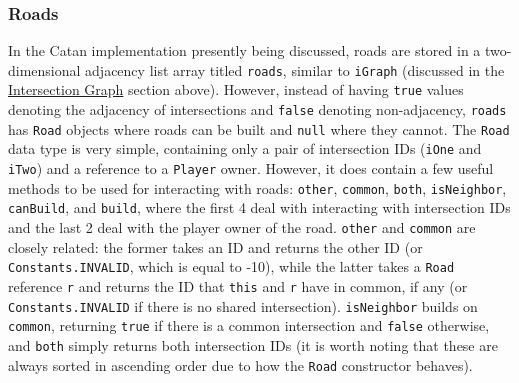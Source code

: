 \documentclass[pageno]{jpaper}
\begin{document}
\begin{doublespacing}
\subsubsection{Roads}

In the Catan implementation presently being discussed, roads are stored in a two-dimensional adjacency list array titled \lstinline$roads$, similar to \lstinline$iGraph$ (discussed in the \hyperlink{sec:intersection_graph}{Intersection Graph} section above). However, instead of having \lstinline$true$ values denoting the adjacency of intersections and \lstinline$false$ denoting non-adjacency, \lstinline$roads$ has \lstinline$Road$ objects where roads can be built and \lstinline$null$ where they cannot. The \lstinline$Road$ data type is very simple, containing only a pair of intersection IDs (\lstinline$iOne$ and \lstinline$iTwo$) and a reference to a \lstinline$Player$ owner. However, it does contain a few useful methods to be used for interacting with roads: \lstinline$other$, \lstinline$common$, \lstinline$both$, \lstinline$isNeighbor$, \lstinline$canBuild$, and \lstinline$build$, where the first 4 deal with interacting with intersection IDs and the last 2 deal with the player owner of the road. \lstinline$other$ and \lstinline$common$ are closely related: the former takes an ID and returns the other ID (or \lstinline$Constants.INVALID$, which is equal to -10), while the latter takes a \lstinline$Road$ reference \lstinline$r$ and returns the ID that \lstinline$this$ and \lstinline$r$ have in common, if any (or \lstinline$Constants.INVALID$ if there is no shared intersection). \lstinline$isNeighbor$ builds on \lstinline$common$, returning \lstinline$true$ if there is a common intersection and \lstinline$false$ otherwise, and \lstinline$both$ simply returns both intersection IDs (it is worth noting that these are always sorted in ascending order due to how the \lstinline$Road$ constructor behaves). 


\end{doublespacing}
\end{document}

